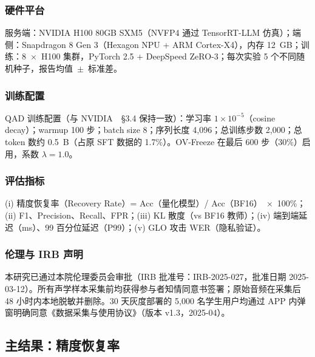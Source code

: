 \documentclass[UTF8,a4paper,10pt,twocolumn]{ctexart}
\theoremstyle{plain}
\begin{document}
\subsubsection{硬件平台}

服务端：NVIDIA H100 80GB SXM5（NVFP4 通过 TensorRT-LLM 仿真）；端侧：Snapdragon 8 Gen 3（Hexagon NPU + ARM Cortex-X4），内存 12~GB；训练：8~$\times$~H100 集群，PyTorch 2.5 + DeepSpeed ZeRO-3；每次实验 5 个不同随机种子，报告均值~$\pm$~标准差。

\subsubsection{训练配置}

QAD 训练配置（与 NVIDIA~\cite{xin2026qad}~\S3.4 保持一致）：学习率 $1 \times 10^{-5}$（cosine decay）；warmup 100 步；batch size 8；序列长度 4,096；总训练步数 2,000；总 token 数约 0.5~B（占原 SFT 数据的 1.7\%）。OV-Freeze 在最后 600 步（30\%）启用，系数 $\lambda = 1.0$。

\subsubsection{评估指标}

(i) 精度恢复率（Recovery Rate）= Acc（量化模型）/ Acc（BF16）~$\times$~100\%；(ii) F1、Precision、Recall、FPR；(iii) KL 散度（vs BF16 教师）；(iv) 端到端延迟（ms）、99 百分位延迟（P99）；(v) GLO 攻击 WER（隐私验证）。

\subsubsection{伦理与 IRB 声明}

本研究已通过本院伦理委员会审批（IRB 批准号：IRB-2025-027，批准日期 2025-03-12）。所有声学样本采集前均获得参与者知情同意书签署；原始音频在采集后 48 小时内本地脱敏并删除。30 天灰度部署的 5,000 名学生用户均通过 APP 内弹窗明确同意《数据采集与使用协议》（版本 v1.3，2025-04）。

\subsection{主结果：精度恢复率}
\end{document}
